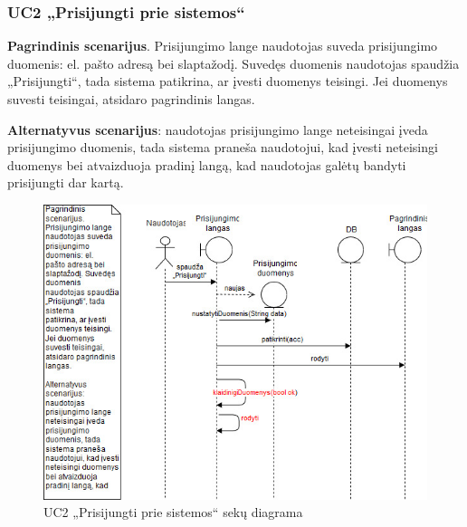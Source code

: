 \documentclass{VUMIFPSbakalaurinis}
\begin{document}
\subsubsection{UC2 „Prisijungti prie sistemos“}
\textbf{Pagrindinis scenarijus}. Prisijungimo lange naudotojas suveda prisijungimo duomenis: el. pašto adresą bei slaptažodį. Suvedęs duomenis naudotojas spaudžia „Prisijungti“, tada sistema patikrina, ar įvesti duomenys teisingi. Jei duomenys suvesti teisingai, atsidaro pagrindinis langas.
\par \textbf{Alternatyvus scenarijus}: naudotojas prisijungimo lange neteisingai įveda prisijungimo duomenis, tada sistema praneša naudotojui, kad įvesti neteisingi duomenys bei atvaizduoja pradinį langą, kad naudotojas galėtų bandyti prisijungti dar kartą.

\begin{figure}[H]
	\centering
	\includegraphics[scale=0.6]{img/Sequence/2sequence}
	\caption{UC2 „Prisijungti prie sistemos“ sekų diagrama}
	\label{img:uc2seq}
\end{figure}
\end{document}

